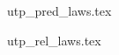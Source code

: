 \documentclass[11pt,a4paper]{article}
\begin{document}

% 




\newpage



\newpage



\newpage

 {utp_pred_laws.tex}

\newpage

 {utp_rel_laws.tex}



% 

%
%
\end{document}

